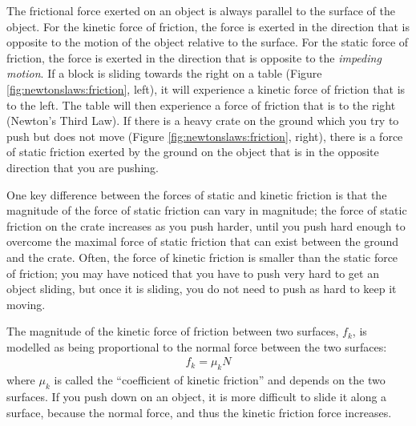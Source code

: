 The frictional force exerted on an object is always parallel to the surface of the object. For the kinetic force of friction, the force is exerted in the direction that is opposite to the motion of the object relative to the surface. For the static force of friction, the force is exerted in the direction that is opposite to the \textit{impeding motion}. If a block is sliding towards the right on a table (Figure \ref{fig:newtonslaws:friction}, left), it will experience a kinetic force of friction that is to the left. The table will then experience a force of friction that is to the right (Newton's Third Law). If there is a heavy crate on the ground which you try to push but does not move (Figure \ref{fig:newtonslaws:friction}, right), there is a force of static friction exerted by the ground on the object that is in the opposite direction that you are pushing. 

One key difference between the forces of static and kinetic friction is that the magnitude of the force of static friction can vary in magnitude; the force of static friction on the crate increases as you push harder, until you push hard enough to overcome the maximal force of static friction that can exist between the ground and the crate. Often, the force of kinetic friction is smaller than the static force of friction; you may have noticed that you have to push very hard to get an object sliding, but once it is sliding, you do not need to push as hard to keep it moving.

The magnitude of the kinetic force of friction between two surfaces, $f_k$, is modelled as being proportional to the normal force between the two surfaces:
\begin{align*}
f_k=\mu_kN
\end{align*}
where $\mu_k$ is called the ``coefficient of kinetic friction'' and depends on the two surfaces. If you push down on an object, it is more difficult to slide it along a surface, because the normal force, and thus the kinetic friction force increases.

